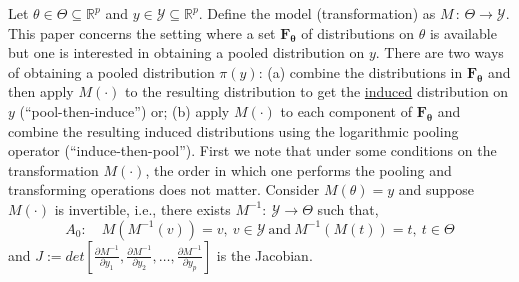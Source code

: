 \documentclass[a4paper, notitlepage, 10pt]{article}
\begin{document}
Let $\theta \in \Theta \subseteq \mathbb{R}^p$ and $y \in \mathcal{Y} \subseteq \mathbb{R}^p$. 
Define the model (transformation) as $M \,:\, \Theta \to \mathcal{Y}$. 
This paper concerns the setting where a set $\mathbf{F_\theta}$ of distributions on $\theta$ is available but one is interested in obtaining a pooled distribution on $y$.
There are two ways of obtaining a pooled distribution $\pi(y)$: (a) combine the distributions in $\mathbf{F_\theta}$ and then apply $M(\cdot)$ to the resulting distribution to get the \underline{induced} distribution on $y$ (``pool-then-induce'') or; (b) apply  $M(\cdot)$ to each component of $\mathbf{F_\theta}$ and combine the resulting induced distributions using the logarithmic pooling operator (``induce-then-pool''). 
First we note that under some conditions on the transformation $M(\cdot)$, the order in which one performs the pooling and transforming operations does not matter.
Consider $M(\theta) = y$ and suppose $M(\cdot)$ is invertible, i.e., there exists $M^{-1}: \: \mathcal{Y} \to \Theta$ such that,
\[A_0:\quad M(M^{-1}(v)) = v,\: v \in \mathcal{Y}\: \text{and}\: M^{-1}(M(t)) = t, \: t \in \Theta \]
and $J := det \left[ \frac{\partial M^{-1}}{\partial y_1}, \frac{\partial M^{-1}}{\partial y_2}, \ldots, \frac{\partial M^{-1}}{\partial y_p}\right]$ is the Jacobian.
\end{document}
